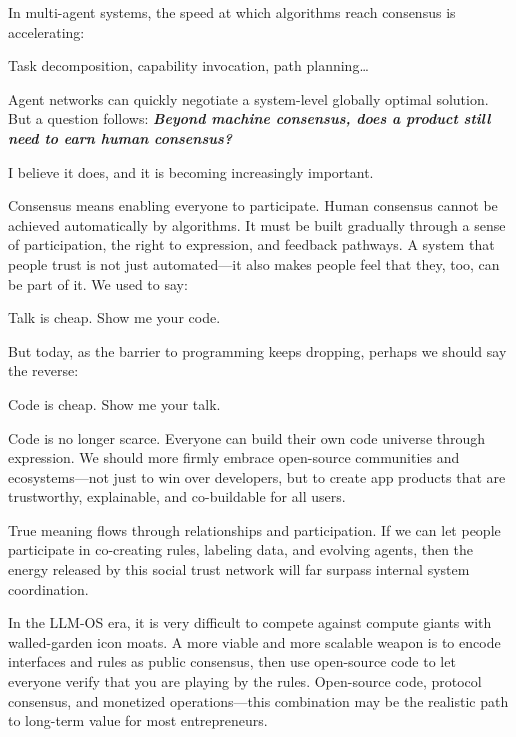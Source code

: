 In multi-agent systems, the speed at which algorithms reach consensus is accelerating:

Task decomposition, capability invocation, path planning\ldots

Agent networks can quickly negotiate a system-level globally optimal solution. But a question follows:
\textbf{\textit{Beyond machine consensus, does a product still need to earn human consensus?
}}

I believe it does, and it is becoming increasingly important.

\vspace{1em}

Consensus means enabling everyone to participate.
Human consensus cannot be achieved automatically by algorithms. It must be built gradually through a sense of participation, the right to expression, and feedback pathways.
A system that people trust is not just automated---it also makes people feel that they, too, can be part of it.
We used to say:

\begin{myquote}
Talk is cheap. Show me your code.
\end{myquote}

But today, as the barrier to programming keeps dropping, perhaps we should say the reverse:

\begin{myquote}
Code is cheap. Show me your talk.
\end{myquote}

Code is no longer scarce. Everyone can build their own code universe through expression. We should more firmly embrace open-source communities and ecosystems---not just to win over developers, but to create app products that are trustworthy, explainable, and co-buildable for all users.

True meaning flows through relationships and participation.
If we can let people participate in co-creating rules, labeling data, and evolving agents, then the energy released by this social trust network will far surpass internal system coordination.

\vspace{1em}

In the LLM-OS era, it is very difficult to compete against compute giants with walled-garden icon moats.
A more viable and more scalable weapon is to encode interfaces and rules as public consensus, then use open-source code to let everyone verify that you are playing by the rules.
Open-source code, protocol consensus, and monetized operations---this combination may be the realistic path to long-term value for most entrepreneurs.

